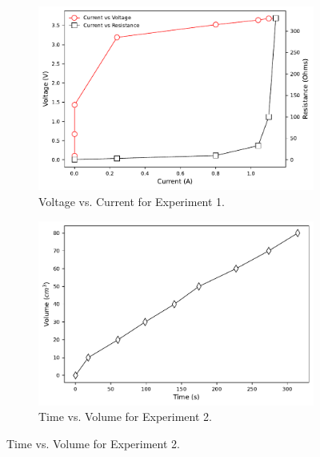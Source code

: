 \begin{figure}[H]
    \centering
    \begin{subfigure}[t]{0.45\textwidth}
        \centering
        \includegraphics[width=\textwidth]{Output/Exp1.pdf}
        \caption{Voltage vs. Current for Experiment 1.}
        \label{fig:summary_results:exp1}
    \end{subfigure}
    \hfill
    \begin{subfigure}[t]{0.45\textwidth}
        \centering
        \includegraphics[width=\textwidth]{Output/Exp2.pdf}
        \caption{Time vs. Volume for Experiment 2.}
        \label{fig:summary_results:exp2}
    \end{subfigure}

    \vspace{1cm}  %


\end{figure}
